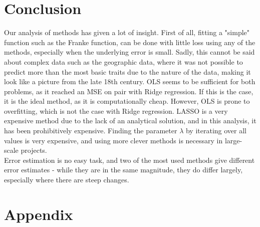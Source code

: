 \documentclass[11pt,a4paper,titlepage]{article}
\begin{document}
\section{Conclusion}
Our analysis of methods has given a lot of insight. First of all, fitting a "simple" function such as the  Franke function, can be done with little loss using any of the methods, especially when the underlying error is small. Sadly, this cannot be said about complex data such as the geographic data, where it was not possible to predict more than the most basic traits due to the nature of the data, making it look like a picture from the late 18th century. OLS seems to be sufficient for both problems, as it reached an MSE on pair with Ridge regression. If this is the case, it is the ideal method, as it is computationally cheap. However, OLS is prone to overfitting, which is not the case with Ridge regression. LASSO is a very expensive method due to the lack of an analytical solution, and in this analysis, it has been prohibitively expensive. Finding the parameter $\lambda$ by iterating over all values is very expensive, and using more clever methods is necessary in large-scale projects. \\
Error estimation is no easy task, and two of the most used methods give different error estimates - while they are in the same magnitude, they do differ largely, especially where there are steep changes. 
\section{Appendix}
\end{document}
